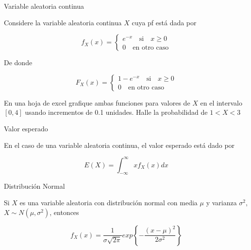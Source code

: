 \documentclass{beamer}
\begin{document}
\begin{frame}{Variable aleatoria continua}

Considere la variable aleatoria continua $X$ cuya pf está dada por

\begin{equation*}
    f_X(x)=
    \begin{cases}
        e^{-x} \quad \text{si} \quad x\geq 0\\
        0 \quad \text{en otro caso}
    \end{cases}
\end{equation*}

De donde 

\begin{equation*}
    F_X(x)=
    \begin{cases}
        1-e^{-x} \quad \text{si} \quad x\geq 0\\
        0 \quad \text{en otro caso}
    \end{cases}
\end{equation*}

En una hoja de excel grafique ambas funciones para valores de $X$ en el intervalo $[0,4]$ usando incrementos de 0.1 unidades. Halle la probabilidad de $1<X<3$
    
\end{frame}

\begin{frame}{Valor esperado}

En el caso de una variable aleatoria continua, el valor esperado está dado por

\begin{equation*}
    E(X)=\int_{-\infty}^{\infty}xf_X(x)dx
\end{equation*}
    
\end{frame}

\begin{frame}{Distribución Normal}

Si $X$ es una variable aleatoria con distribución normal con media $\mu$ y varianza $\sigma^2$, $X\sim N(\mu,\sigma^2)$, entonces

\begin{equation*}
    f_X(x)=\dfrac{1}{\sigma\sqrt{2\pi}}exp\left\{-\dfrac{(x-\mu)^2}{2\sigma^2}\right\}
\end{equation*}
    
\end{frame}


\printbibliography
\end{document}
